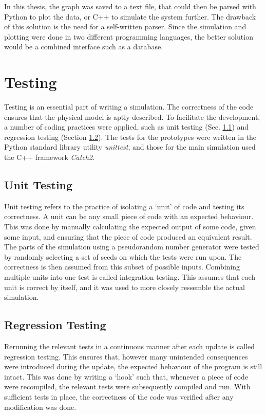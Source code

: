 In this thesis, the graph was saved to a text file, that could then be parsed with Python to plot the data, or C++ to simulate the system further. The drawback of this solution is the need for a self-written parser. Since the simulation and plotting were done in two different programming languages, the better solution would be a combined interface such as a database.

\section{Testing}
\label{sec:Testing}

Testing is an essential part of writing a simulation. The correctness of the code ensures that the physical model is aptly described. To facilitate the development, a number of coding practices were applied, such as unit testing (Sec. \ref{sec:UnitTesting}) and regression testing (Section \ref{sec:RegressionTesting}). The tests for the prototypes were written in the Python standard library utility \textit{unittest}, and those for the main simulation used the C++ framework \textit{Catch2}.

\subsection{Unit Testing}
\label{sec:UnitTesting}

Unit testing refers to the practice of isolating a `unit' of code and testing its correctness. A unit can be any small piece of code with an expected behaviour. This was done by manually calculating the expected output of some code, given some input, and ensuring that the piece of code produced an equivalent result. The parts of the simulation using a pseudorandom number generator were tested by randomly selecting a set of seeds on which the tests were run upon. The correctness is then assumed from this subset of possible inputs. Combining multiple units into one test is called integration testing. This assumes that each unit is correct by itself, and it was used to more closely ressemble the actual simulation.

\subsection{Regression Testing}
\label{sec:RegressionTesting}

Rerunning the relevant tests in a continuous manner after each update is called regression testing. This ensures that, however many unintended consequences were introduced during the update, the expected behaviour of the program is still intact. This was done by writing a `hook' such that, whenever a piece of code were recompiled, the relevant tests were subsequently compiled and run. With sufficient tests in place, the correctness of the code was verified after any modification was done.


